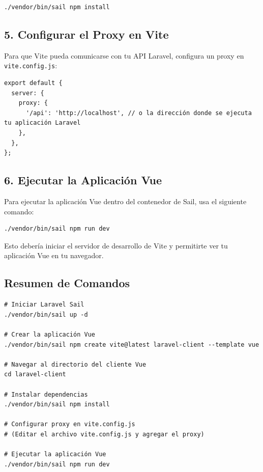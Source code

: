 \documentclass[11pt]{article}
\begin{document}
\begin{verbatim}
./vendor/bin/sail npm install
\end{verbatim}

\subsection{5. Configurar el Proxy en Vite}
\label{sec:org43667af}

Para que Vite pueda comunicarse con tu API Laravel, configura un proxy en \texttt{vite.config.js}:

\begin{verbatim}
export default {
  server: {
    proxy: {
      '/api': 'http://localhost', // o la dirección donde se ejecuta tu aplicación Laravel
    },
  },
};
\end{verbatim}

\subsection{6. Ejecutar la Aplicación Vue}
\label{sec:org05c4f79}

Para ejecutar la aplicación Vue dentro del contenedor de Sail, usa el
siguiente comando:

\begin{verbatim}
./vendor/bin/sail npm run dev
\end{verbatim}

Esto debería iniciar el servidor de desarrollo de Vite y permitirte
ver tu aplicación Vue en tu navegador.

\subsection{Resumen de Comandos}
\label{sec:org786f40c}

\begin{verbatim}
# Iniciar Laravel Sail
./vendor/bin/sail up -d

# Crear la aplicación Vue
./vendor/bin/sail npm create vite@latest laravel-client --template vue

# Navegar al directorio del cliente Vue
cd laravel-client

# Instalar dependencias
./vendor/bin/sail npm install

# Configurar proxy en vite.config.js
# (Editar el archivo vite.config.js y agregar el proxy)

# Ejecutar la aplicación Vue
./vendor/bin/sail npm run dev
\end{verbatim}
\end{document}
